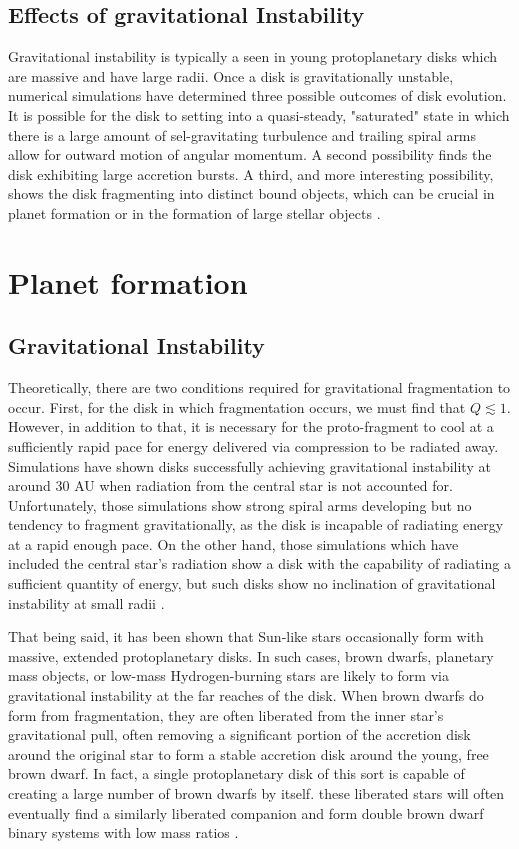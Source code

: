 \documentclass[aps,pra,twocolumn]{revtex4-1}
\begin{document}
\subsection{\label{section 3.1} Effects of gravitational Instability}
Gravitational instability is typically a seen in young protoplanetary disks which are massive and have large radii.  Once a disk is gravitationally unstable, numerical simulations have determined three possible outcomes of disk evolution.  It is possible for the disk to setting into a quasi-steady, "saturated" state in which there is a large amount of sel-gravitating turbulence and trailing spiral arms allow for outward motion of angular momentum.  A second possibility finds the disk exhibiting large accretion bursts.  A third, and more interesting possibility, shows the disk fragmenting into distinct bound objects, which can be crucial in planet formation or in the formation of large stellar objects \cite{armitage2011}.

\section{\label{section 4}Planet formation}

\subsection{\label{section 4.1} Gravitational Instability}
Theoretically, there are two conditions required for gravitational fragmentation to occur.  First, for the disk in which fragmentation occurs, we must find that $Q \lesssim 1$.  However, in addition to that, it is necessary for the proto-fragment to cool at a sufficiently rapid pace for energy delivered via compression to be radiated away.  Simulations have shown disks successfully achieving gravitational instability at around 30 AU when radiation from the central star is not accounted for.  Unfortunately, those simulations show strong spiral arms developing but no tendency to fragment gravitationally, as the disk is incapable of radiating energy at a rapid enough pace.  On the other hand, those simulations which have included the central star's radiation show a disk with the capability of radiating a sufficient quantity of energy, but such disks show no inclination of gravitational instability at small radii \cite{whitworth2007}.

That being said, it has been shown that Sun-like stars occasionally form with massive, extended protoplanetary disks.  In such cases, brown dwarfs, planetary mass objects, or low-mass Hydrogen-burning stars are likely to form via gravitational instability at the far reaches of the disk.  When brown dwarfs do form from fragmentation, they are often liberated from the inner star's gravitational pull, often removing a significant portion of the accretion disk around the original star to form a stable accretion disk around the young, free brown dwarf.  In fact, a single protoplanetary disk of this sort is capable of creating a large number of brown dwarfs by itself.  these liberated stars will often eventually find a similarly liberated companion and form double brown dwarf binary systems with low mass ratios \cite{hubber 2007}.  



\end{document}
